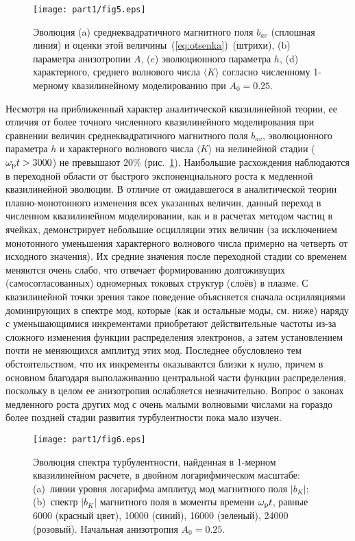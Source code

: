 \begin{figure}[b]
\centering
\texttt{[image: part1/fig5.eps]}
\caption{Эволюция (a) среднеквадратичного магнитного поля $b_{av}$ (сплошная линия) и оценки этой величины~(\ref{eq:otsenka})~(штрихи), (b) параметра анизотропии $A$, (c) эволюционного параметра $h$, (d) характерного, среднего волнового числа $\langle K\rangle$ согласно численному 1-мерному квазилинейному моделированию при $A_0=0.25$.}
\label{fig:evol1d_QL_A025}
\end{figure}
Несмотря на приближенный характер аналитической квазилинейной теории, ее отличия от более точного численного квазилинейного моделирования при сравнении величин среднеквадратичного магнитного поля $b_{av}$, эволюционного параметра $h$ и характерного волнового числа $\langle K\rangle$ на нелинейной стадии ($\omega_\mathrm{p} t > 3000$) не превышают $20\%$ (рис.~\ref{fig:evol1d_QL_A025}). Наибольшие расхождения наблюдаются в переходной области от быстрого экспоненциального роста к медленной квазилинейной эволюции. В отличие от ожидавшегося в аналитической теории плавно-монотонного изменения всех указанных величин, данный переход в численном квазилинейном моделировании, как и в расчетах методом частиц в ячейках, демонстрирует небольшие осцилляции этих величин (за исключением монотонного уменьшения характерного волнового числа примерно на четверть от исходного значения). Их средние значения после переходной стадии со временем меняются очень слабо, что отвечает формированию долгоживущих (самосогласованных) одномерных токовых структур (слоёв) в плазме. С квазилинейной точки зрения такое поведение объясняется сначала осцилляциями доминирующих в спектре мод, которые (как и остальные моды, см. ниже) наряду с уменьшающимися инкрементами приобретают действительные частоты из-за сложного изменения функции распределения электронов, а затем установлением почти не меняющихся амплитуд этих мод. Последнее обусловлено тем обстоятельством, что их инкременты оказываются близки к нулю, причем в основном благодаря выполаживанию центральной части функции распределения, поскольку в целом ее анизотропия ослабляется незначительно. Вопрос о законах медленного роста других мод с очень малыми волновыми числами на гораздо более поздней стадии развития турбулентности пока мало изучен.





\begin{figure}[t]
\centering
\texttt{[image: part1/fig6.eps]}
\caption{Эволюция спектра турбулентности, найденная в 1-мерном квазилинейном расчете, в двойном логарифмическом масштабе: (a)~линии уровня логарифма амплитуд мод магнитного поля $|b_K|$; 
(b)~спектр $|b_K|$ магнитного поля в моменты времени $\omega_\mathrm{p} t$, равные 6000 (красный цвет), 10000 (синий), 16000 (зеленый), 24000 (розовый). Начальная анизотропия $A_0=0.25$.}
\label{fig:dinspectrA025_1d}
\end{figure}

